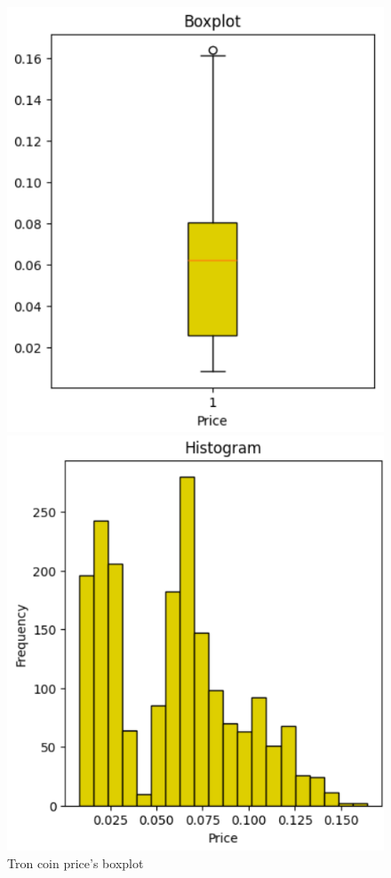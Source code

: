 \documentclass{ieeeojies}
\begin{document}
\begin{figure}[H]
  \centering
  \begin{minipage}{0.23\textwidth}
    \centering
    \includegraphics[width=1\textwidth]{Image/Discriptive/boxplot_tron_new.png}
    \caption{Tron coin price's boxplot}
    \label{fig:5}
  \end{minipage}
  \hfill
  \begin{minipage}{0.23\textwidth}
    \centering
    \includegraphics[width=1\textwidth]{Image/Discriptive/histo_tron_new.png}

\end{minipage}
\end{figure}
\end{document}
